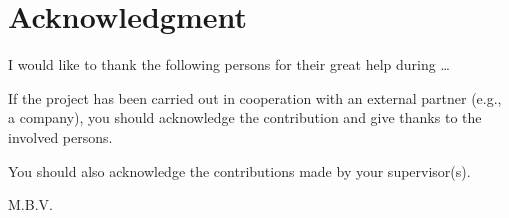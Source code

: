 \chapter*{Acknowledgment}
I would like to thank the following persons for their great help during \ldots

If the project has been carried out in cooperation with an external partner (e.g., a company), you should acknowledge the contribution and give thanks to the involved persons.

You should also acknowledge the contributions made by your supervisor(s).

\begin{flushright}
M.B.V.\\[1pc]
\end{flushright}
